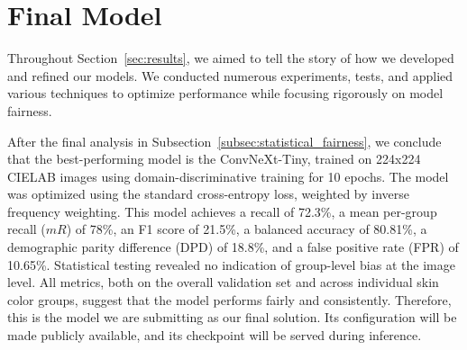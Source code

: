 \section{Final Model}

Throughout Section~\ref{sec:results}, we aimed to tell the story of how we developed and refined our models. We conducted numerous experiments, tests, and applied various techniques to optimize performance while focusing rigorously on model fairness. 

After the final analysis in Subsection~\ref{subsec:statistical_fairness}, we conclude that the best-performing model is the ConvNeXt-Tiny, trained on 224x224 CIELAB images using domain-discriminative training for 10 epochs. The model was optimized using the standard cross-entropy loss, weighted by inverse frequency weighting. This model achieves a recall of 72.3\%, a mean per-group recall ($mR$) of 78\%, an F1 score of 21.5\%, a balanced accuracy of 80.81\%, a demographic parity difference (DPD) of 18.8\%, and a false positive rate (FPR) of 10.65\%. Statistical testing revealed no indication of group-level bias at the image level. All metrics, both on the overall validation set and across individual skin color groups, suggest that the model performs fairly and consistently. Therefore, this is the model we are submitting as our final solution. Its configuration will be made publicly available, and its checkpoint will be served during inference.
